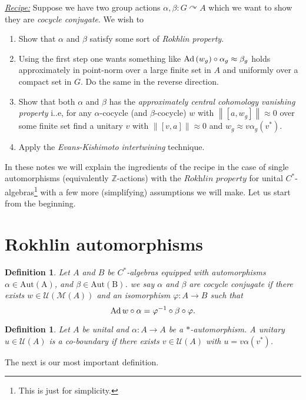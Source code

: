 \documentclass[11pt,a4paper,oneside]{amsart}
\newtheorem{definition}[theorem]{Definition}
\newcommand{\Ad}{{\rm Ad\,}}
\newcommand{\norm}[1]{\left\|#1\right\|} %
\newcommand{\acts}{\curvearrowright}
\begin{document}
\begin{tcolorbox}[width=17cm, colframe=black, colback=Cyan! 20, halign=left]
\underline{\textit{Recipe:}} Suppose we have two group actions $\alpha, \beta: G\acts A$ which we want to show they are \textit{cocycle conjugate}. We wish to \begin{enumerate}
\item Show that $\alpha$ and $\beta$ satisfy some sort of \textit{Rokhlin property}. 
\item Using the first step one wants something like $\Ad(w_g)\circ \alpha_g \approx \beta_g$ holds approximately in point-norm over a large finite set in $A$ and uniformly over a compact set in $G$. Do the same in the reverse direction. 
\item Show that both $\alpha$ and $\beta$ has the \textit{approximately central cohomology vanishing property} i..e, for any $\alpha$-cocycle (and $\beta$-cocycle) $w$ with $\norm {[a,w_g]}\approx 0$ over some finite set find a unitary $v$ with $\norm{[v,a]}\approx 0$ and $w_g\approx v\alpha_g(v^*)$. 
\item Apply the \textit{Evans-Kishimoto intertwining} technique. 
\end{enumerate}
\end{tcolorbox}

In these notes we will explain the ingredients of the recipe in the case of single automorphisms (equivalently $\mathbb Z$-actions) with the $\textit{Rokhlin property}$  for unital $C^*$-algebras\footnote{This is just for simplicity.} with a few more (simplifying) assumptions we will make. Let us start from the beginning. 

\section{Rokhlin automorphisms}

\begin{tcolorbox}[colback= LimeGreen! 50]
\begin{definition}
Let $A$ and $B$ be $C^*$-algebras equipped with automorphisms $\alpha\in \mathrm{Aut(A)}$, and $\beta\in \mathrm{Aut(B)}$. we say $\alpha$ and $\beta$ are cocycle conjugate if there exists $w\in \mathcal U(\mathcal M(A))$ and an isomorphism $\varphi: A\rightarrow B$ such that $$\Ad w\circ \alpha= \varphi^{-1}\circ \beta \circ \varphi.$$ 
\end{definition}
\end{tcolorbox}

\begin{tcolorbox}[colback= LimeGreen! 50]
\begin{definition}
Let $A$ be unital and $\alpha: A\rightarrow A$ be a $*$-automorphism. A unitary $u\in \mathcal U(A)$ is a co-boundary if there exists $v\in \mathcal U(A)$ with $u=v\alpha(v^*)$. 
\end{definition} 
\end{tcolorbox}
The next is our most important definition. 
\end{document}
